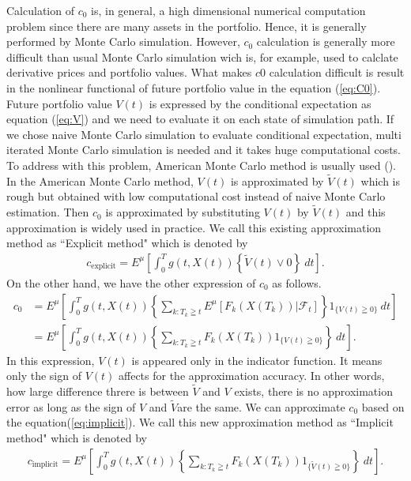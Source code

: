 \documentclass[12pt]{article}
\begin{document}
Calculation of $c_0$ is, in general, a high dimensional numerical computation problem
since there are many assets in the portfolio.
Hence, it is generally performed by Monte Carlo simulation.
However, $c_0$ calculation is generally more difficult than usual Monte Carlo 
simulation wich is, for example, used to calclate derivative prices and portfolio values.
What makes $c0$ calculation difficult is result in
the nonlinear functional of future portfolio value in the equation (\ref{eq:C0}).
Future portfolio value $V(t)$ is expressed by the conditional expectation as 
equation (\ref{eq:V}) and we need to evaluate it on each state of simulation path.
If we chose naive Monte Carlo simulation to evaluate conditional
expectation, multi iterated Monte Carlo simulation is needed and it takes huge computational costs.
To address with this problem, American Monte Carlo method is usually used (\cite{G}).
In the American Monte Carlo method, $V(t)$ is approximated by $\tilde{V}(t)$ which is rough 
but obtained with low computational cost instead of naive Monte Carlo estimation.
Then $c_0$ is approximated by substituting $V(t)$ by $\tilde{V}(t)$ and this approximation
is widely used in practice.
We call this existing approximation method as ``Explicit method" which is denoted by 
\begin{align}
    c_{\text{explicit}}=E^{\mu}\left[\int_{0}^T g(t, X(t))\left\{\tilde{V}(t) \vee0 \right \} \ dt \right].
\end{align}
On the other hand, we have the other expression of $c_0$ as follows.
\begin{align}\label{eq:implicit}
  c_0 &= E^{\mu}\left[\int_{0}^T g(t, X(t)) \left\{ \sum_{k:T_k\geqq t} E^{\mu} \left[ F_k({X}(T_k)) |\mathcal{F}_t \right]\right \} 1_{\{V(t) \geqq 0\}}\ dt \right]\nonumber \\
      &=E^{\mu}\left[\int_{0}^T  g(t, X(t)) \left\{ \sum_{k:T_k\geqq t} F_k({X}(T_k)) 1_{\{V(t) \geqq 0\}}\right \} \ dt \right].
\end{align}
In this expression, $V(t)$ is appeared only in the indicator function. It means only 
the sign of
$V(t)$ affects for the approximation accuracy. In other words, how large difference 
threre is between
$\tilde{V}$ and $V$ exists, there is no approximation error as long as the sign
of $V$ and $\tilde{V}$are the same.
We can approximate $c_0$ based on the equation(\ref{eq:implicit}). 
We call this new approximation method as ``Implicit method" which is denoted by 
\begin{align}
    c_{\text{implicit}}=E^{\mu}\left[\int_{0}^Tg(t, X(t)) \left\{ \sum_{k:T_k\geqq t} F_k({X}(T_k)) 1_{\{\tilde{V}(t) \geqq 0\}}\right \} \ dt \right].
\end{align}
\end{document}
